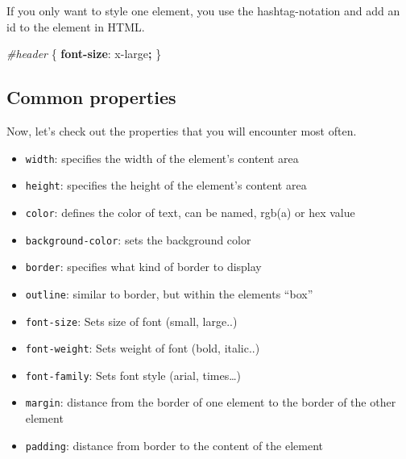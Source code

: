 \documentclass[
]{book}
\newenvironment{Shaded}{\begin{snugshade}}{\end{snugshade}}
\newcommand{\DecValTok}[1]{\textcolor[rgb]{0.00,0.00,0.81}{#1}}
\newcommand{\KeywordTok}[1]{\textcolor[rgb]{0.13,0.29,0.53}{\textbf{#1}}}
\newcommand{\NormalTok}[1]{#1}
\newcommand{\OperatorTok}[1]{\textcolor[rgb]{0.81,0.36,0.00}{\textbf{#1}}}
\newcommand{\PreprocessorTok}[1]{\textcolor[rgb]{0.56,0.35,0.01}{\textit{#1}}}
\providecommand{\tightlist}{%
  \setlength{\itemsep}{0pt}\setlength{\parskip}{0pt}}
\begin{document}
If you only want to style one element, you use the hashtag-notation and add an id to the element in HTML.

\begin{Shaded}
\begin{Highlighting}[]
\PreprocessorTok{\#header}\NormalTok{ \{                           }
  \KeywordTok{font{-}size}\NormalTok{: }\DecValTok{x{-}large}\OperatorTok{;}
\NormalTok{\}}
\end{Highlighting}
\end{Shaded}

\hypertarget{common-properties}{%
\subsection*{Common properties}\label{common-properties}}

Now, let's check out the properties that you will encounter most often.

\begin{itemize}
\tightlist
\item
  \texttt{width}: specifies the width of the element's content area\\
\item
  \texttt{height}: specifies the height of the element's content area\\
\item
  \texttt{color}: defines the color of text, can be named, rgb(a) or hex value\\
\item
  \texttt{background-color}: sets the background color\\
\item
  \texttt{border}: specifies what kind of border to display\\
\item
  \texttt{outline}: similar to border, but within the elements ``box''\\
\item
  \texttt{font-size}: Sets size of font (small, large..)\\
\item
  \texttt{font-weight}: Sets weight of font (bold, italic..)\\
\item
  \texttt{font-family}: Sets font style (arial, times\ldots)\\
\item
  \texttt{margin}: distance from the border of one element to the border of the other element\\
\item
  \texttt{padding}: distance from border to the content of the element
\end{itemize}
\end{document}

